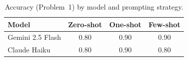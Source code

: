 \begin{table}[h]
  \centering
  \begin{tabular}{lccc}
    \toprule
    Model & Zero-shot & One-shot & Few-shot \\
    \midrule
    Gemini 2.5 Flash & 0.80 & 0.90 & 0.90 \\
    Claude Haiku & 0.80 & 0.90 & 0.80 \\
    \bottomrule
  \end{tabular}
  \caption{Accuracy (Problem~1) by model and prompting strategy.}
  \label{tab:icl-accuracy}
\end{table}